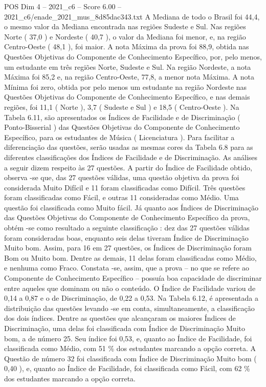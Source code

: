 \begin{textsample}{POS Dim 4 – 2021\_c6 – Score 6.00 – 2021\_c6/enade\_2021\_mus\_8d85dac343.txt}
A Mediana de todo o Brasil foi 44,4, o mesmo valor da Mediana encontrada nas regiões Sudeste e Sul.
Nas regiões Norte ( 37,0 ) e Nordeste ( 40,7 ), o valor da Mediana foi menor, e, na região Centro-Oeste ( 48,1 ), foi maior.
A nota Máxima da prova foi 88,9, obtida nas Questões Objetivas do Componente de Conhecimento Específico, por, pelo menos, um estudante em três regiões Norte, Sudeste e Sul.
Na região Nordeste, a nota Máxima foi 85,2 e, na região Centro-Oeste, 77,8, a menor nota Máxima.
A nota Mínima foi zero, obtida por pelo menos um estudante na região Nordeste nas Questões Objetivas do Componente de Conhecimento Específico, e nas demais regiões, foi 11,1 ( Norte ), 3,7 ( Sudeste e Sul ) e 18,5 ( Centro-Oeste ).
Na Tabela 6.11, são apresentados os Índices de Facilidade e de Discriminação ( Ponto-Bisserial ) das Questões Objetivas do Componente de Conhecimento Específico, para os estudantes de Música ( Licenciatura ).
Para facilitar a diferenciação das questões, serão usadas as mesmas cores da Tabela 6.8 para as diferentes classificações dos Índices de Facilidade e de Discriminação.
As análises a seguir dizem respeito às 27 questões.
A partir do Índice de Facilidade obtido, observa -se que, das 27 questões válidas, uma questão objetiva da prova foi considerada Muito Difícil e 11 foram classificadas como Difícil.
Três questões foram classificadas como Fácil, e outras 11 consideradas como Médio.
Uma questão foi classificada como Muito fácil.
Já quanto aos Índices de Discriminação das Questões Objetivas do Componente de Conhecimento Específico da prova, obtém -se como resultado a seguinte classificação : dez das 27 questões válidas foram consideradas boas, enquanto seis delas tiveram Índice de Discriminação Muito bom.
Assim, para 16 em 27 questões, os Índices de Discriminação foram Bom ou Muito bom.
Dentre as demais, 11 delas foram classificadas como Médio, e nenhuma como Fraco.
Constata -se, assim, que a prova – no que se refere ao Componente de Conhecimento Específico – possuía boa capacidade de discriminar entre aqueles que dominam ou não o conteúdo.
O Índice de Facilidade variou de 0,14 a 0,87 e o de Discriminação, de 0,22 a 0,53.
Na Tabela 6.12, é apresentada a distribuição das questões levando -se em conta, simultaneamente, a classificação dos dois índices.
Dentre as questões que alcançaram os maiores Índices de Discriminação, uma delas foi classificada com Índice de Discriminação Muito bom, a de número 25.
Seu índice foi 0,53, e, quanto ao Índice de Facilidade, foi classificada como Médio, com 51 \% dos estudantes marcando a opção correta.
A Questão de número 32 foi classificada com Índice de Discriminação Muito bom ( 0,40 ), e, quanto ao Índice de Facilidade, foi classificada como Fácil, com 62 \% dos estudantes marcando a opção correta.

\end{textsample}
